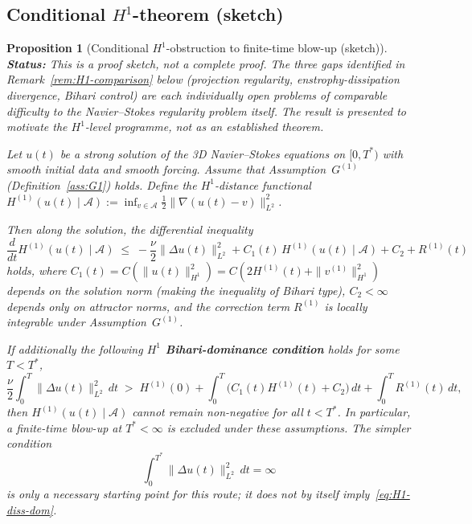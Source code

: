 \documentclass[12pt,a4paper]{article}
\theoremstyle{definition}
\theoremstyle{plain}
\newtheorem{proposition}[definition]{Proposition}
\theoremstyle{remark}
\begin{document}
\subsection{Conditional \texorpdfstring{$H^1$}{H1}-theorem (sketch)}

\begin{proposition}[Conditional $H^1$-obstruction to finite-time blow-up (sketch)]
\label{thm:H1-main}
\textbf{Status:} This is a \emph{proof sketch}, not a complete proof.
The three gaps identified in Remark~\ref{rem:H1-comparison} below
(projection regularity, enstrophy-dissipation divergence, Bihari
control) are each individually open problems of comparable difficulty
to the Navier--Stokes regularity problem itself.  The result is
presented to motivate the $H^1$-level programme, not as an established
theorem.

\medskip\noindent
Let $u(t)$ be a strong solution of the 3D Navier--Stokes equations on
$[0,T^*)$ with smooth initial data and smooth forcing.  Assume that
Assumption~$G^{(1)}$ (Definition~\ref{ass:G1}) holds.  Define the
$H^1$-distance functional
$H^{(1)}(u(t) \mid \mathcal{A})
:= \inf_{v \in \mathcal{A}} \tfrac{1}{2}\|\nabla(u(t)-v)\|_{L^2}^2$.

Then along the solution, the differential inequality
\begin{equation}\label{eq:H1-diff}
  \frac{d}{dt}H^{(1)}(u(t) \mid \mathcal{A})
  \;\le\;
  -\frac{\nu}{2}\|\Delta u(t)\|_{L^2}^2
  + C_1(t)\,H^{(1)}(u(t) \mid \mathcal{A})
  + C_2
  + R^{(1)}(t)
\end{equation}
holds, where $C_1(t) = C(\|u(t)\|_{H^1}^2) = C(2H^{(1)}(t)
+ \|v^{(1)}\|_{H^1}^2)$ depends on the solution norm (making the
inequality of Bihari type), $C_2 < \infty$ depends only on
attractor norms,
and the correction term $R^{(1)}$ is locally integrable under
Assumption~$G^{(1)}$.

If additionally the following \textbf{$H^1$ Bihari-dominance condition}
holds for some $T<T^*$,
\begin{equation}\label{eq:H1-diss-dom}
  \frac{\nu}{2}\int_0^T\|\Delta u(t)\|_{L^2}^2\,dt
  \;>\;
  H^{(1)}(0)+\int_0^T\!\bigl(C_1(t)H^{(1)}(t)+C_2\bigr)\,dt
  +\int_0^T R^{(1)}(t)\,dt,
\end{equation}
then $H^{(1)}(u(t) \mid \mathcal{A})$ cannot remain non-negative
for all $t < T^*$.  In particular, a finite-time blow-up at
$T^* < \infty$ is excluded under these assumptions.  The simpler
condition
\begin{equation}\label{eq:enstr-diss-div}
  \int_0^{T^*}\|\Delta u(t)\|_{L^2}^2\,dt = \infty
\end{equation}
is only a necessary starting point for this route; it does not by
itself imply~\eqref{eq:H1-diss-dom}.
\end{proposition}
\end{document}

